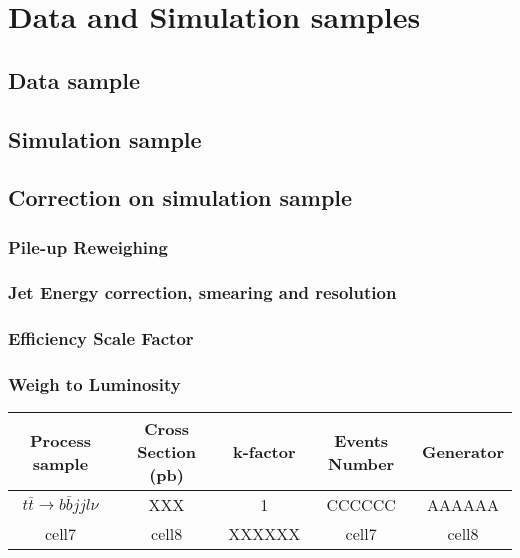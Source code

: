 

\section{Data and Simulation samples}
\label{sec:DataAndMC}

	\subsection{Data sample}
	\label{ssec:DataAndMC_Data}


	\subsection{Simulation sample}
	\label{ssec:DataAndMC_MC}

	\subsection{Correction on simulation sample}
	\label{ssec:DataAndMC_corMC}

		\subsubsection{Pile-up Reweighing}
		\label{sssec:DataAndMC_PU}

		\subsubsection{Jet Energy correction, smearing and resolution}
		\label{sssec:DataAndMC_JE_CSR}

		\subsubsection{Efficiency Scale Factor}
		\label{sssec:DataAndMC_EffSF}

		\subsubsection{Weigh to Luminosity}
		\label{sssec:DataAndMC_lumi}





\begin{center}
\begin{tabular}{ c c c c c }
\hline
Process sample & Cross Section (pb) & k-factor & Events Number & Generator \\ 
\hline
$t$$\bar{t}\rightarrow b \bar{b}jjl\nu$ & XXX & 1 & CCCCCC & AAAAAA \\
\hline
cell7 & cell8 & XXXXXX & cell7 & cell8 \\
\hline  
\end{tabular}
\end{center}


\FloatBarrier
